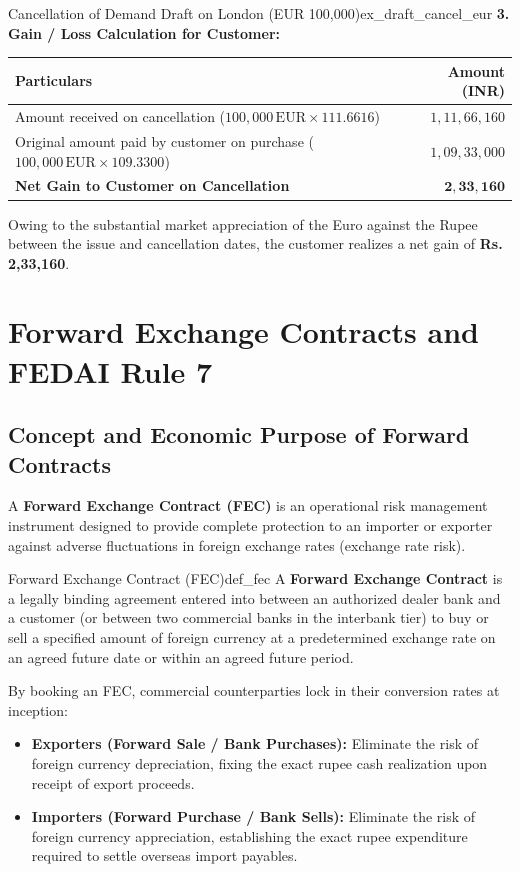 \begin{example}{Cancellation of Demand Draft on London (EUR 100,000)}{ex_draft_cancel_eur}
\noindent\textbf{3. Gain / Loss Calculation for Customer:}
\begin{center}
\small
\begin{tabularx}{\linewidth}{Xr}
\toprule
\textbf{Particulars} & \textbf{Amount (INR)} \\
\midrule
Amount received on cancellation ($100,000\,\text{EUR} \times 111.6616$) & $1,11,66,160$ \\
Original amount paid by customer on purchase ($100,000\,\text{EUR} \times 109.3300$) & $1,09,33,000$ \\
\midrule
\textbf{Net Gain to Customer on Cancellation} & $\mathbf{2,33,160}$ \\
\bottomrule
\end{tabularx}
\end{center}
Owing to the substantial market appreciation of the Euro against the Rupee between the issue and cancellation dates, the customer realizes a net gain of \textbf{Rs. 2,33,160}.
\end{example}

\section{Forward Exchange Contracts and FEDAI Rule 7}

\subsection{Concept and Economic Purpose of Forward Contracts}
A \textbf{Forward Exchange Contract (FEC)} is an operational risk management instrument designed to provide complete protection to an importer or exporter against adverse fluctuations in foreign exchange rates (exchange rate risk).

\begin{definition}{Forward Exchange Contract (FEC)}{def_fec}
A \textbf{Forward Exchange Contract} is a legally binding agreement entered into between an authorized dealer bank and a customer (or between two commercial banks in the interbank tier) to buy or sell a specified amount of foreign currency at a predetermined exchange rate on an agreed future date or within an agreed future period.
\end{definition}

By booking an FEC, commercial counterparties lock in their conversion rates at inception:
\begin{itemize}[leftmargin=*]
    \item \textbf{Exporters (Forward Sale / Bank Purchases):} Eliminate the risk of foreign currency depreciation, fixing the exact rupee cash realization upon receipt of export proceeds.
    \item \textbf{Importers (Forward Purchase / Bank Sells):} Eliminate the risk of foreign currency appreciation, establishing the exact rupee expenditure required to settle overseas import payables.
\end{itemize}

